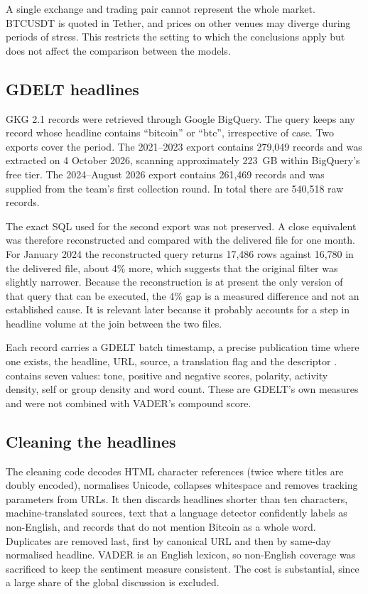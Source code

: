 
A single exchange and trading pair cannot represent the whole market. BTCUSDT is quoted in Tether, and prices on other venues may diverge during periods of stress. This restricts the setting to which the conclusions apply but does not affect the comparison between the models.

\subsection{GDELT headlines}
GKG 2.1 records were retrieved through Google BigQuery. The query keeps any record whose headline contains ``bitcoin'' or ``btc'', irrespective of case. Two exports cover the period. The 2021--2023 export contains 279,049 records and was extracted on 4 October 2026, scanning approximately 223~GB within BigQuery's free tier. The 2024--August 2026 export contains 261,469 records and was supplied from the team's first collection round. In total there are 540,518 raw records.

The exact SQL used for the second export was not preserved. A close equivalent was therefore reconstructed and compared with the delivered file for one month. For January 2024 the reconstructed query returns 17,486 rows against 16,780 in the delivered file, about 4\% more, which suggests that the original filter was slightly narrower. Because the reconstruction is at present the only version of that query that can be executed, the 4\% gap is a measured difference and not an established cause. It is relevant later because it probably accounts for a step in headline volume at the join between the two files.

Each record carries a GDELT batch timestamp, a precise publication time where one exists, the headline, URL, source, a translation flag and the  descriptor \cite{gdelttone}.  contains seven values: tone, positive and negative scores, polarity, activity density, self or group density and word count. These are GDELT's own measures and were not combined with VADER's compound score.

\subsection{Cleaning the headlines}
The cleaning code decodes HTML character references (twice where titles are doubly encoded), normalises Unicode, collapses whitespace and removes tracking parameters from URLs. It then discards headlines shorter than ten characters, machine-translated sources, text that a language detector confidently labels as non-English, and records that do not mention Bitcoin as a whole word. Duplicates are removed last, first by canonical URL and then by same-day normalised headline. VADER is an English lexicon, so non-English coverage was sacrificed to keep the sentiment measure consistent. The cost is substantial, since a large share of the global discussion is excluded.

